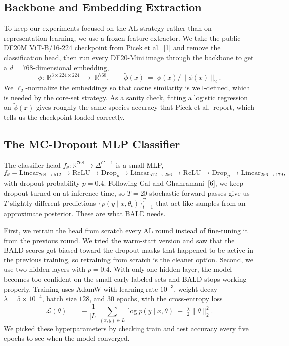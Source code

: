\documentclass[11pt]{article}
\begin{document}
\subsection{Backbone and Embedding Extraction}

To keep our experiments focused on the AL strategy rather than on
representation learning, we use a frozen feature extractor. We take the
public DF20M ViT-B/16-224 checkpoint from Picek et al.~[1] and remove the
classification head, then run every DF20-Mini image through the backbone to
get a $d = 768$-dimensional embedding,
\[
\phi:\ \mathbb{R}^{3 \times 224 \times 224} \;\to\; \mathbb{R}^{768},
\qquad
\tilde\phi(x) \;=\; \phi(x) / \|\phi(x)\|_2.
\]
We $\ell_2$-normalize the embeddings so that cosine similarity is
well-defined, which is needed by the core-set strategy. As a sanity check,
fitting a logistic regression on $\tilde\phi(x)$ gives roughly the same
species accuracy that Picek et al.\ report, which tells us the checkpoint
loaded correctly. 

\subsection{The MC-Dropout MLP Classifier}

The classifier head $f_\theta : \mathbb{R}^{768} \to \Delta^{C-1}$ is a
small MLP,
\[
f_\theta = \text{Linear}_{768 \to 512} \to \text{ReLU} \to \text{Drop}_p
\to \text{Linear}_{512 \to 256} \to \text{ReLU} \to \text{Drop}_p
\to \text{Linear}_{256 \to 179},
\]
with dropout probability $p = 0.4$. Following Gal and Ghahramani~[6], we
keep dropout turned on at inference time, so $T = 20$ stochastic forward
passes give us $T$ slightly different predictions
$\{p(y \mid x, \theta_t)\}_{t=1}^{T}$ that act like samples from an
approximate posterior. These are what BALD needs.

First, we retrain the head from
scratch every AL round instead of fine-tuning it from the previous round.
We tried the warm-start version and saw that the BALD scores got biased
toward the dropout masks that happened to be active in the previous
training, so retraining from scratch is the cleaner option. Second, we use
two hidden layers with $p = 0.4$. With only one hidden layer, the model
becomes too confident on the small early labeled sets and BALD stops working
properly. Training uses AdamW with learning rate $10^{-3}$, weight decay
$\lambda = 5 \times 10^{-4}$, batch size $128$, and $30$ epochs, with the
cross-entropy loss
\[
\mathcal{L}(\theta) \;=\; -\frac{1}{|L|} \sum_{(x,y) \in L}
\log p(y \mid x, \theta) \;+\; \tfrac{\lambda}{2} \|\theta\|_2^2.
\]
We picked these hyperparameters by checking train and test accuracy every
five epochs to see when the model converged.
\end{document}
